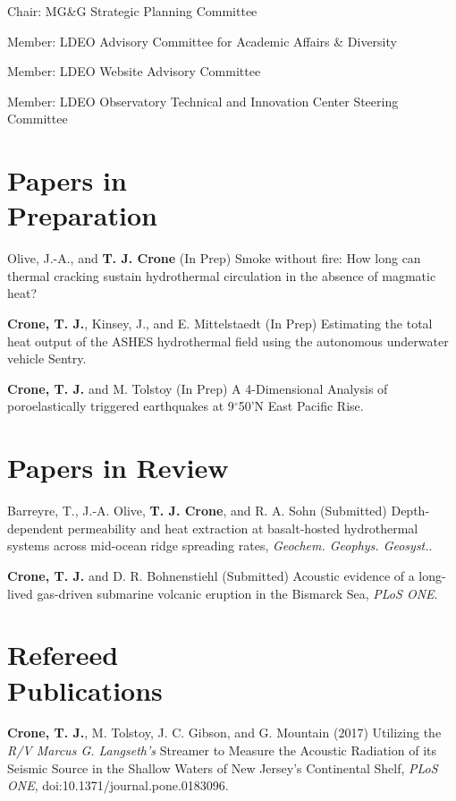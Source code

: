 \documentclass[11pt]{res}
\begin{document}
\begin{resume}
Chair: MG\&G Strategic Planning Committee

Member: LDEO Advisory Committee for Academic Affairs \& Diversity

Member: LDEO Website Advisory Committee

Member: LDEO Observatory Technical and Innovation Center Steering Committee
\vspace{0.2in}

\section{\sc Papers in\\Preparation}

Olive, J.-A., and {\bf T. J. Crone} (In Prep) Smoke without fire: How long can thermal cracking sustain hydrothermal circulation in the absence of magmatic heat?

{\bf Crone, T. J.}, Kinsey, J., and E. Mittelstaedt (In Prep) Estimating the total heat output of the ASHES hydrothermal field using the autonomous underwater vehicle Sentry.

{\bf Crone, T. J.} and M. Tolstoy (In Prep) A 4-Dimensional Analysis of poroelastically triggered earthquakes at 9$^\circ$50'N East Pacific Rise.

\section{\sc Papers in Review}

Barreyre, T., J.-A. Olive, {\bf T. J. Crone}, and R. A. Sohn (Submitted) Depth-dependent permeability and heat extraction at basalt-hosted hydrothermal systems across mid-ocean ridge spreading rates, {\em Geochem. Geophys. Geosyst.}.

{\bf Crone, T. J.} and D. R. Bohnenstiehl (Submitted) Acoustic evidence of a long-lived gas-driven submarine volcanic eruption in the Bismarck Sea, {\em PLoS ONE}.

\section{\sc Refereed\\Publications}

{\bf Crone, T. J.}, M. Tolstoy, J. C. Gibson, and G. Mountain (2017)
Utilizing the \textit{R/V Marcus G. Langseth's} Streamer to Measure the Acoustic Radiation of its Seismic Source in the Shallow Waters of New Jersey's Continental Shelf, \textit{PLoS ONE}, doi:10.1371/journal.pone.0183096.


\end{resume}
\end{document}
